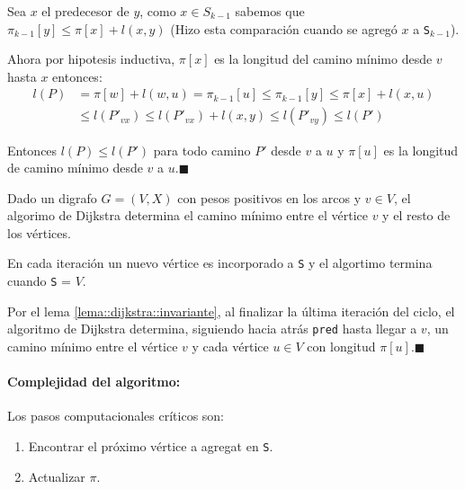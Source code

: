 \begin{demo}
\begin{itemize}
          Sea \(x\) el predecesor de \(y\), como \(x\in S_{k-1}\) sabemos que \(\pi_{k-1}[y]\leq\pi[x] + l(x,y)\) (Hizo esta comparación cuando se agregó \(x\) a \texttt{S}\(_{k-1}\)).
  \end{itemize}
\end{demo}
\begin{demoPart}
  Ahora por hipotesis inductiva, \(\pi[x]\) es la longitud del camino mínimo desde \(v\) hasta \(x\) entonces:
  \begin{align*}
    l(P) & = \pi[w] + l(w,u) = \pi_{k-1}[u] \leq \pi_{k-1}[y] \leq \pi[x] + l(x,u) \\
         & \leq l(P'_{vx}) \leq l(P'_{vx}) + l(x,y) \leq l(P'_{vy}) \leq l(P')
  \end{align*}

  Entonces \(l(P)\leq l(P')\) para todo camino \(P'\) desde \(v\) a \(u\) y \(\pi[u]\) es la longitud de camino mínimo desde \(v\) a \(u\).\hfill\(\blacksquare\)
\end{demoPart}

\begin{theorem}
  Dado un digrafo \(G=(V,X)\) con pesos positivos en los arcos y \(v\in V\), el algorimo de Dijkstra determina el camino mínimo entre el vértice \(v\) y el resto de los vértices.
\end{theorem}

\begin{demo}
  En cada iteración un nuevo vértice es incorporado a \texttt{S} y el algortimo termina cuando \texttt{S} = \(V\).

  Por el lema \ref{lema::dijkstra::invariante}, al finalizar la última iteración del ciclo, el algoritmo de Dijkstra determina, siguiendo hacia atrás \texttt{pred} hasta llegar a \(v\), un camino mínimo entre el vértice \(v\) y cada vértice \(u\in V\) con longitud \(\pi[u]\).\hfill\(\blacksquare\)
\end{demo}

\paragraph{Complejidad del algoritmo:} Los pasos computacionales críticos son:
\begin{enumerate}
  \item\label{disjkstra::paso::agregarV} Encontrar el próximo vértice a agregat en \texttt{S}.
  \item\label{disjkstra::paso::actualizarPi} Actualizar \(\pi\).
\end{enumerate}

